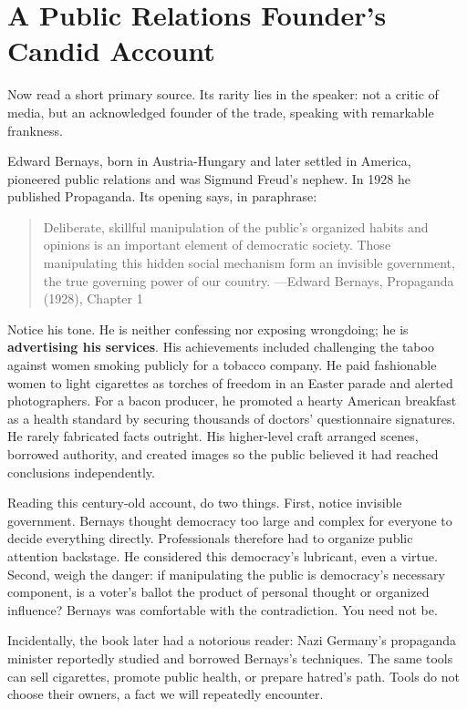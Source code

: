\section{A Public Relations Founder's Candid Account}
Now read a short primary source. Its rarity lies in the speaker: not a critic of media, but an acknowledged founder of the trade, speaking with remarkable frankness.

Edward Bernays, born in Austria-Hungary and later settled in America, pioneered public relations and was Sigmund Freud's nephew. In 1928 he published Propaganda. Its opening says, in paraphrase:

\begin{quote}
Deliberate, skillful manipulation of the public's organized habits and opinions is an important element of democratic society. Those manipulating this hidden social mechanism form an invisible government, the true governing power of our country. ---Edward Bernays, Propaganda (1928), Chapter 1
\end{quote}
Notice his tone. He is neither confessing nor exposing wrongdoing; he is \textbf{advertising his services}. His achievements included challenging the taboo against women smoking publicly for a tobacco company. He paid fashionable women to light cigarettes as torches of freedom in an Easter parade and alerted photographers. For a bacon producer, he promoted a hearty American breakfast as a health standard by securing thousands of doctors' questionnaire signatures. He rarely fabricated facts outright. His higher-level craft arranged scenes, borrowed authority, and created images so the public believed it had reached conclusions independently.

Reading this century-old account, do two things. First, notice invisible government. Bernays thought democracy too large and complex for everyone to decide everything directly. Professionals therefore had to organize public attention backstage. He considered this democracy's lubricant, even a virtue. Second, weigh the danger: if manipulating the public is democracy's necessary component, is a voter's ballot the product of personal thought or organized influence? Bernays was comfortable with the contradiction. You need not be.

Incidentally, the book later had a notorious reader: Nazi Germany's propaganda minister reportedly studied and borrowed Bernays's techniques. The same tools can sell cigarettes, promote public health, or prepare hatred's path. Tools do not choose their owners, a fact we will repeatedly encounter.

